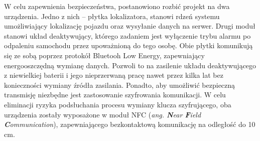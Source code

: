 W celu zapewnienia bezpieczeństwa, postanowiono rozbić projekt na dwa urządzenia. Jedno z nich – płytka lokalizatora, stanowi rdzeń systemu umożliwiający lokalizację pojazdu oraz wysyłanie danych na serwer. Drugi moduł stanowi układ deaktywujący, którego zadaniem jest wyłączenie trybu alarmu po odpaleniu samochodu przez upoważnioną do tego osobę. Obie płytki komunikują się ze sobą poprzez protokół Bluetooh Low Energy, zapewniający energooszczędną wymianę danych. Pozwoli to na zasilenie układu deaktywującego z niewielkiej baterii i jego nieprzerwaną pracę nawet przez kilka lat bez konieczności wymiany źródła zasilania. 
Ponadto, aby umożliwić  bezpieczną transmisję niezbędne jest zastosowanie szyfrowania komunikacji. W celu eliminacji ryzyka podsłuchania procesu wymiany klucza szyfrującego, oba urządzenia zostały wyposażone w moduł NFC (\textit{ang. \textbf{N}ear \textbf{F}ield \textbf{C}ommunication}), zapewniającego bezkontaktową komunikację na odległość do 10 cm.
